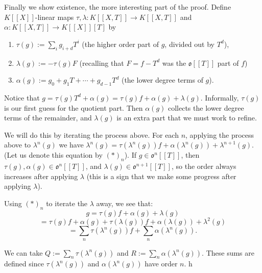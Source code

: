 Finally we show existence, the more interesting part of the proof. Define $K[[X]]$-linear maps $\tau,\lambda:K[[X,T]]\rightarrow K[[X,T]]$ and $\alpha:K[[X,T]]\rightarrow K[[X]][T]$ by 
\begin{enumerate}
  \item  $\tau(g):=\sum_i g_{i+d} T^i$ (the higher order part of $g$, divided out by $T^d$),
  \item  $\lambda(g):=-\tau(g)F$ (recalling that $F=f-T^d$ was the $\mathfrak{o}[[T]]$ part of $f$)
  \item  $\alpha(g):=g_0+g_1T+\cdots+g_{d-1}T^d$ (the lower degree terms of $g$).
\end{enumerate}

Notice that $g=\tau(g)T^d+\alpha(g)=\tau(g)f+\alpha(g)+\lambda(g)$. Informally, $\tau(g)$ is our first guess for the quotient part. Then $\alpha(g)$ collects the lower degree terms of the remainder, and $\lambda(g)$ is an extra part that we must work to refine. 

We will do this by iterating the process above. For each $n$, applying the process above to $\lambda^n(g)$ we have $\lambda^n(g)=\tau(\lambda^n(g))f+\alpha(\lambda^n(g))+\lambda^{n+1}(g)$. (Let us denote this equation by $(\ast)_n$). If $g\in \mathfrak{o}^n[[T]]$, then $\tau(g),\alpha(g)\in\mathfrak{o}^n[[T]]$, and $\lambda(g)\in\mathfrak{o}^{n+1}[[T]]$, so the order always increases after applying $\lambda$ (this is a sign that we make some progress after applying $\lambda$). 

Using $(\ast)_n$ to iterate the $\lambda$ away, we see that:
$$g=\tau(g)f+\alpha(g)+\lambda(g)$$
$$=\tau(g)f+\alpha(g)+\tau(\lambda(g))f+\alpha(\lambda(g))+\lambda^2(g)$$
$$=\sum_n\tau(\lambda^n(g))f+\sum_n\alpha(\lambda^n(g)).$$

We can take $Q:=\sum_n\tau(\lambda^n(g))$ and $R:=\sum_n\alpha(\lambda^n(g))$. These sums are defined since $\tau(\lambda^n(g))$ and $\alpha(\lambda^n(g))$ have order $n$.
h
